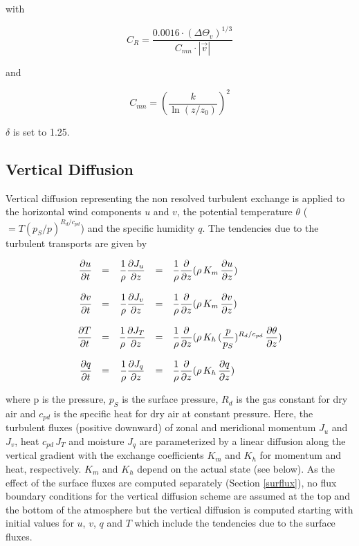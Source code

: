with

\begin{equation}
C_R=\frac{0.0016\cdot (\Delta \Theta_v)^{1/3}}{C_{mn}\cdot |\vec{v}|}
\end{equation}

and

\begin{equation}
C_{mn}=\left(\frac{k}{\ln(z/z_0)}\right)^2
\end{equation}

$\delta$ is set to 1.25.

\subsection{Vertical Diffusion \label{vdiff}}

Vertical diffusion representing the non resolved
turbulent exchange is applied to the horizontal wind
components $u$ and $v$, the potential temperature
$\theta$ ($= T (p_S/p)^{R_d/c_{pd}}$) and the
specific
humidity
$q$. The
tendencies due to the turbulent transports are given by 

\begin{equation}
\begin{array}{rcccl}
\displaystyle
\frac{\partial u}{\partial t} & = & \displaystyle \frac
{1}{\rho}\frac{\partial J_u}{\partial z} & = & \displaystyle \frac
{1}{\rho}\frac{\partial }{\partial z} ( \rho\, K_m \,
\frac{\partial u}{\partial z}) \\
&&&& \\
\displaystyle \frac{\partial v}{\partial t} & = & \displaystyle \frac
{1}{\rho}\frac{\partial J_v}{\partial z} & = & \displaystyle \frac
{1}{\rho}\frac{\partial }{\partial z} ( \rho \, K_m \,
\frac{\partial v}{\partial z} )\\
&&&& \\
\displaystyle \frac{\partial T}{\partial t} & = &\displaystyle  \frac
{1}{\rho}\frac{\partial J_T}{\partial z} & = & \displaystyle \frac
{1}{\rho}\frac{\partial }{\partial z} ( \rho \, K_h \, 
(\frac{p}{p_S})^{R_d/c_{pd}}\,\frac{\partial
\theta}{\partial
z})
\\
&&&& \\
\displaystyle \frac{\partial q}{\partial t} & = & \displaystyle \frac
{1}{\rho}\frac{\partial J_q}{\partial z} & = & \displaystyle \frac
{1}{\rho}\frac{\partial }{\partial z}( \rho\, K_h \,
\frac{\partial q}{\partial z} )
\end{array}
\end{equation}

where p is the
pressure, $p_S$ is the
surface pressure, $R_d$ is the gas constant
for dry air and $c_{pd}$ is
the specific heat for dry air at constant pressure. Here,
the turbulent
fluxes (positive downward) of zonal and meridional
momentum $J_u$ and 
$J_v$,
heat $c_{pd} \, J_T$
and moisture $J_q$ are parameterized by a linear
diffusion along the vertical gradient with the exchange
coefficients $K_m$ and $K_h$ for momentum and
heat,
respectively. $K_m$ and $K_h$ depend on the actual
state (see below).
As the effect of the surface fluxes are computed
separately (Section \ref{surflux}), no flux boundary
conditions for the vertical diffusion scheme  are
assumed
at the top and the bottom of the atmosphere but the
vertical diffusion is computed starting with
initial values for $u$, $v$, $q$ and $T$ which include
the tendencies due to the surface fluxes. 

